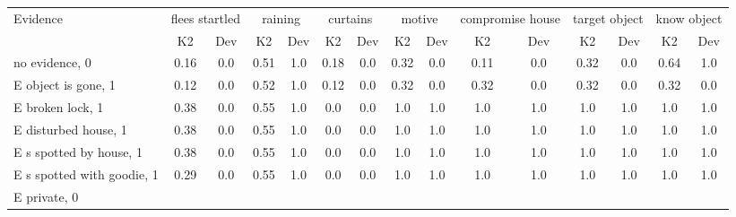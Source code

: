 \begin{table}\begin{tabular}{l|cc|cc|cc|cc|cc|cc|cc}\toprule\multirow{2}{*}{Evidence} & \multicolumn{2}{c}{flees startled}& \multicolumn{2}{c}{raining}& \multicolumn{2}{c}{curtains}& \multicolumn{2}{c}{motive}& \multicolumn{2}{c}{compromise house}& \multicolumn{2}{c}{target object}& \multicolumn{2}{c}{know object}\\& {K2} & {Dev}& {K2} & {Dev}& {K2} & {Dev}& {K2} & {Dev}& {K2} & {Dev}& {K2} & {Dev}& {K2} & {Dev}\\\midrule
no evidence, 0 & \cellcolor{Bittersweet}0.16&\cellcolor{Bittersweet}0.0&0.51&1.0&\cellcolor{Bittersweet}0.18&\cellcolor{Bittersweet}0.0&\cellcolor{Bittersweet}0.32&\cellcolor{Bittersweet}0.0&\cellcolor{Bittersweet}0.11&\cellcolor{Bittersweet}0.0&\cellcolor{Bittersweet}0.32&\cellcolor{Bittersweet}0.0&\cellcolor{Bittersweet}0.64&\cellcolor{Bittersweet}1.0\\E object is gone, 1 & \cellcolor{Bittersweet}0.12&\cellcolor{Bittersweet}0.0&0.52&1.0&\cellcolor{Bittersweet}0.12&\cellcolor{Bittersweet}0.0&\cellcolor{Bittersweet}0.32&\cellcolor{Bittersweet}0.0&\cellcolor{Bittersweet}0.32&\cellcolor{Bittersweet}0.0&\cellcolor{Bittersweet}0.32&\cellcolor{Bittersweet}0.0&\cellcolor{Bittersweet}0.32&\cellcolor{Bittersweet}0.0\\E broken lock, 1 & 0.38&0.0&0.55&1.0&\cellcolor{Bittersweet}0.0&\cellcolor{Bittersweet}0.0&\cellcolor{Bittersweet}1.0&\cellcolor{Bittersweet}1.0&\cellcolor{Bittersweet}1.0&\cellcolor{Bittersweet}1.0&\cellcolor{Bittersweet}1.0&\cellcolor{Bittersweet}1.0&\cellcolor{Bittersweet}1.0&\cellcolor{Bittersweet}1.0\\E disturbed house, 1 & \cellcolor{Bittersweet}0.38&\cellcolor{Bittersweet}0.0&0.55&1.0&\cellcolor{Bittersweet}0.0&\cellcolor{Bittersweet}0.0&\cellcolor{Bittersweet}1.0&\cellcolor{Bittersweet}1.0&\cellcolor{Bittersweet}1.0&\cellcolor{Bittersweet}1.0&\cellcolor{Bittersweet}1.0&\cellcolor{Bittersweet}1.0&\cellcolor{Bittersweet}1.0&\cellcolor{Bittersweet}1.0\\E s spotted by house, 1 & \cellcolor{Bittersweet}0.38&\cellcolor{Bittersweet}0.0&0.55&1.0&\cellcolor{Bittersweet}0.0&\cellcolor{Bittersweet}0.0&\cellcolor{Bittersweet}1.0&\cellcolor{Bittersweet}1.0&\cellcolor{Bittersweet}1.0&\cellcolor{Bittersweet}1.0&\cellcolor{Bittersweet}1.0&\cellcolor{Bittersweet}1.0&\cellcolor{Bittersweet}1.0&\cellcolor{Bittersweet}1.0\\E s spotted with goodie, 1 & \cellcolor{Bittersweet}0.29&\cellcolor{Bittersweet}0.0&0.55&1.0&\cellcolor{Bittersweet}0.0&\cellcolor{Bittersweet}0.0&\cellcolor{Bittersweet}1.0&\cellcolor{Bittersweet}1.0&\cellcolor{Bittersweet}1.0&\cellcolor{Bittersweet}1.0&\cellcolor{Bittersweet}1.0&\cellcolor{Bittersweet}1.0&\cellcolor{Bittersweet}1.0&\cellcolor{Bittersweet}1.0\\E private, 0 & 
\end{tabular}
\end{table}
